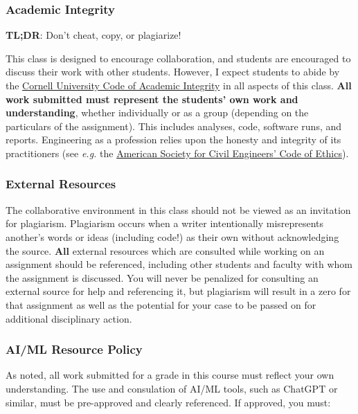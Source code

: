 \documentclass[
  letterpaper,
  DIV=11,
  numbers=noendperiod]{scrartcl}
\begin{document}
\hypertarget{academic-integrity}{%
\subsubsection{Academic Integrity}\label{academic-integrity}}

\textbf{TL;DR}: Don't cheat, copy, or plagiarize!

This class is designed to encourage collaboration, and students are
encouraged to discuss their work with other students. However, I expect
students to abide by the
\href{http://theuniversityfaculty.cornell.edu/academic-integrity/}{Cornell
University Code of Academic Integrity} in all aspects of this class.
\textbf{All work submitted must represent the students' own work and
understanding}, whether individually or as a group (depending on the
particulars of the assignment). This includes analyses, code, software
runs, and reports. Engineering as a profession relies upon the honesty
and integrity of its practitioners (see \emph{e.g.} the
\href{https://www.asce.org/-/media/asce-images-and-files/career-and-growth/ethics/documents/asce-code-ethics.pdf}{American
Society for Civil Engineers' Code of Ethics}).

\hypertarget{external-resources}{%
\subsubsection{External Resources}\label{external-resources}}

The collaborative environment in this class should not be viewed as an
invitation for plagiarism. Plagiarism occurs when a writer intentionally
misrepresents another's words or ideas (including code!) as their own
without acknowledging the source. \textbf{All} external resources which
are consulted while working on an assignment should be referenced,
including other students and faculty with whom the assignment is
discussed. You will never be penalized for consulting an external source
for help and referencing it, but plagiarism will result in a zero for
that assignment as well as the potential for your case to be passed on
for additional disciplinary action.

\hypertarget{aiml-resource-policy}{%
\subsubsection{AI/ML Resource Policy}\label{aiml-resource-policy}}

As noted, all work submitted for a grade in this course must reflect
your own understanding. The use and consulation of AI/ML tools, such as
ChatGPT or similar, must be pre-approved and clearly referenced. If
approved, you must:
\end{document}
